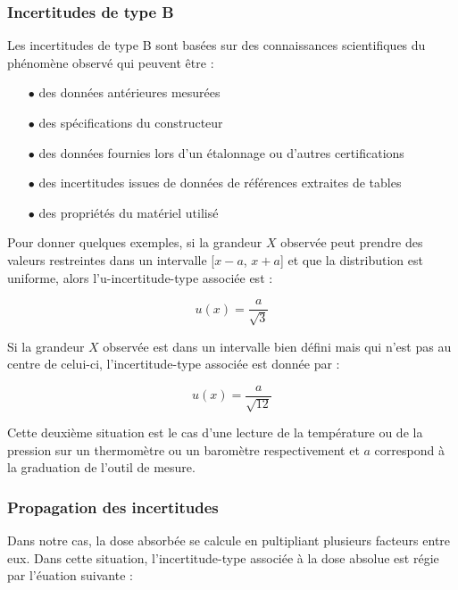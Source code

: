 \documentclass{article}
\begin{document}
\subsubsection{Incertitudes de type B}

Les incertitudes de type B sont basées sur des connaissances scientifiques du phénomène observé qui peuvent être :

\begin{itemize}
  \item[$\bullet$] des données antérieures mesurées
  \item[$\bullet$] des spécifications du constructeur
  \item[$\bullet$] des données fournies lors d'un étalonnage ou d'autres certifications
  \item[$\bullet$] des incertitudes issues de données de références extraites de tables
  \item[$\bullet$] des propriétés du matériel utilisé
\end{itemize}

Pour donner quelques exemples, si la grandeur $X$ observée peut prendre des valeurs restreintes dans un intervalle [$x - a$, $x + a$] et que la distribution est uniforme, alors l'u-incertitude-type associée est :

\begin{equation}
  u(x) = \dfrac{a}{\sqrt{3}}
\end{equation}

Si la grandeur $X$ observée est dans un intervalle bien défini mais qui n'est pas au centre de celui-ci, l'incertitude-type associée est donnée par :

\begin{equation}
  u(x) = \dfrac{a}{\sqrt{12}}
\end{equation}

Cette deuxième situation est le cas d'une lecture de la température ou de la pression sur un thermomètre ou un baromètre respectivement et $a$ correspond à la graduation de l'outil de mesure.

\subsubsection{Propagation des incertitudes}

Dans notre cas, la dose absorbée se calcule en pultipliant plusieurs facteurs entre eux. Dans cette situation, l'incertitude-type associée à la dose absolue est régie par l'éuation suivante :
\end{document}
